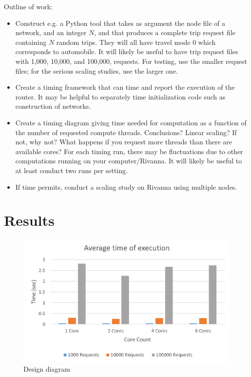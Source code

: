 \documentclass[English]{article}
\theoremstyle{remark}
\numberwithin{equation}{section}
\begin{document}
Outline of work:
\begin{itemize}
\item Construct e.g. a Python tool that takes as argument the node
  file of a network, and an integer $N$, and that produces a complete
  trip request file containing $N$ random trips. They will all have
  travel mode $0$ which corresponds to automobile. It will likely be
  useful to have trip request files with 1,000, 10,000, and 100,000, requests. For testing, use the smaller request files;
  for the serious scaling studies, use the larger one.
\item Create a timing framework that can time and report the execution
  of the router. It may be helpful to separately time initialization
  code such as construction of networks.
\item Create a timing diagram giving time needed for computation as a
  function of the number of requested compute threads. Conclusions?
  Linear scaling? If not, why not? What happens if you request more
  threads than there are available cores? For each timing run, there
  may be fluctuations due to other computations running on your
  computer/Rivanna. It will likely be useful to at least conduct two
  runs per setting.
\item If time permits, conduct a scaling study on Rivanna using
  multiple nodes.

\end{itemize}

\section{Results}
\label{sec:results}
\begin{figure}[H]
    \centering
    \includegraphics{data.png}
    \caption{Design diagram}
    \label{fig:design1}
\end{figure}
\end{document}
